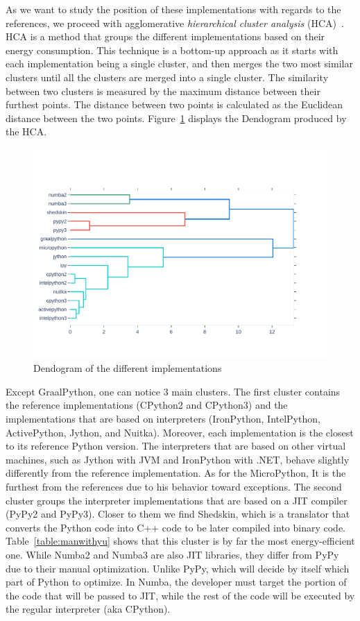 As we want to study the position of these implementations with regards to the references, we proceed with agglomerative \emph{hierarchical cluster analysis} (HCA)~\cite{johnson1967hierarchical}.
HCA is a method that groups the different implementations based on their energy consumption.
This technique is a bottom-up approach as it starts with each implementation being a single cluster, and then merges the two most similar clusters until all the clusters are merged into a single cluster.
The similarity between two clusters is measured by the maximum distance between their furthest points.
The distance between two points is calculated as the Euclidean distance between the two points.
Figure~\ref{fig:dendogram} displays the Dendogram produced by the HCA.

\begin{figure}
      \centering
      \includegraphics[width=\linewidth]{imgs/dendogram_interpreters}
      \caption{Dendogram of the different implementations}
      \label{fig:dendogram}
\end{figure}

Except GraalPython, one can notice 3 main clusters.
The first cluster contains the reference implementations (CPython2 and CPython3) and the implementations that are based on interpreters (IronPython, IntelPython, ActivePython, Jython, and Nuitka).
Moreover, each implementation is the closest to its reference Python version.
The interpreters that are based on other virtual machines, such as Jython with JVM and IronPython with .NET, behave slightly differently from the reference implementation.
As for the MicroPython, It is the furthest from the references due to his behavior toward exceptions.
The second cluster groups the interpreter implementations that are based on a JIT compiler (PyPy2 and PyPy3).
Closer to them we find Shedskin, which is a translator that converts the Python code into C++ code to be later compiled into binary code.
Table~\ref{table:manwithyu} shows that this cluster is by far the most energy-efficient one.
While Numba2 and Numba3 are also JIT libraries, they differ from PyPy due to their manual optimization.
Unlike PyPy, which will decide by itself which part of Python to optimize.
In Numba, the developer must target the portion of the code that will be passed to JIT, while the rest of the code will be executed by the regular interpreter (aka CPython).


